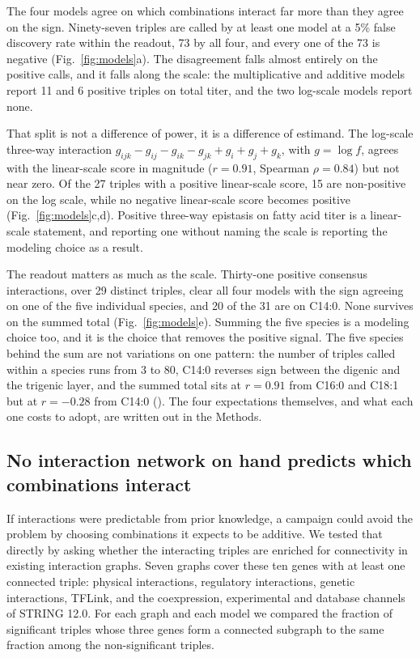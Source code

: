 The four models agree on which combinations interact far more than they agree on the sign.
Ninety-seven triples are called by at least one model at a 5\% false discovery rate within
the readout, 73 by all four, and every one of the 73 is negative (Fig.~\ref{fig:models}a).
The disagreement falls almost entirely on the positive calls, and it falls along the scale:
the multiplicative and additive models report 11 and 6 positive triples on total titer, and
the two log-scale models report none.

That split is not a difference of power, it is a difference of estimand. The log-scale
three-way interaction $g_{ijk} - g_{ij} - g_{ik} - g_{jk} + g_i + g_j + g_k$, with
$g = \log f$, agrees with the linear-scale score in magnitude ($r = 0.91$, Spearman
$\rho = 0.84$) but not near zero. Of the 27 triples with a positive linear-scale score, 15
are non-positive on the log scale, while no negative linear-scale score becomes positive
(Fig.~\ref{fig:models}c,d). Positive three-way epistasis on fatty acid titer is a
linear-scale statement, and reporting one without naming the scale is reporting the modeling
choice as a result.

The readout matters as much as the scale. Thirty-one positive consensus interactions, over
29 distinct triples, clear all four models with the sign agreeing on one of the five
individual species, and 20 of the 31 are on C14:0. None survives on the summed total
(Fig.~\ref{fig:models}e). Summing the five species is a modeling choice too, and it is the
choice that removes the positive signal. The five species behind the sum are not variations
on one pattern: the number of triples called within a species runs from 3 to 80, C14:0
reverses sign between the digenic and the trigenic layer, and the summed total sits at
$r = 0.91$ from C16:0 and C18:1 but at $r = -0.28$ from C14:0
(). The four expectations themselves, and what each one costs to
adopt, are written out in the Methods.

\FloatBarrier
\subsection*{No interaction network on hand predicts which combinations interact}

If interactions were predictable from prior knowledge, a campaign could avoid the problem by
choosing combinations it expects to be additive. We tested that directly by asking whether
the interacting triples are enriched for connectivity in existing interaction graphs. Seven
graphs cover these ten genes with at least one connected triple: physical interactions,
regulatory interactions, genetic interactions, TFLink, and the coexpression, experimental
and database channels of STRING 12.0. For each graph and each model we compared the fraction
of significant triples whose three genes form a connected subgraph to the same fraction
among the non-significant triples.

